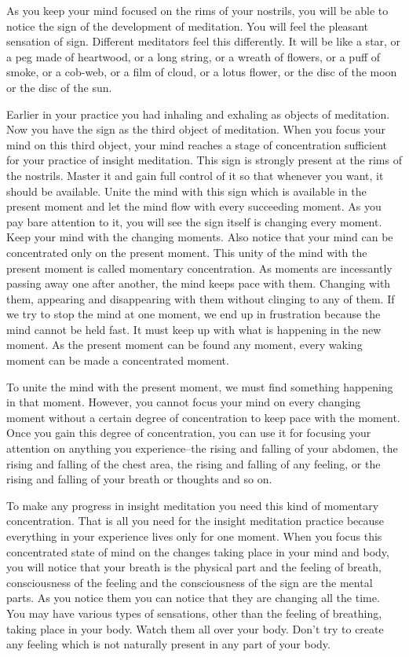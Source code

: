 As you keep your mind focused on the rims of your nostrils, you will be able to
notice the sign of the development of meditation.
You will feel the pleasant sensation of sign. Different meditators feel this differently. It will be like a star, or a peg made of
heartwood, or a long string, or a wreath of flowers, or a puff of smoke, or a cob-web, or a film of cloud, or a lotus flower, or the
disc of the moon or the disc of the sun.

Earlier in your practice you had inhaling and exhaling as objects of meditation.
Now you have the sign as the third object of meditation. When you focus your
mind on this third object, your mind reaches a stage of concentration sufficient
for your practice of insight meditation. This sign is strongly present at the
rims of the nostrils. Master it and gain full control of it so that whenever you
want, it should be available. Unite the mind with this sign which is available
in the present moment and let the mind flow with every succeeding moment. As you
pay bare attention to it, you will see the sign itself is changing every moment.
Keep your mind with the changing moments. Also notice that your mind can be
concentrated only on the present moment. This unity of the mind with the present
moment is called momentary concentration. As moments are incessantly passing
away one after another, the mind keeps pace with them. Changing with them,
appearing and disappearing with them without clinging to any of them. If we try
to stop the mind at one moment, we end up in frustration because the mind cannot
be held fast. It must keep up with what is happening in the new moment. As the
present moment can be found any moment, every waking moment can be made a
concentrated moment.

To unite the mind with the present moment, we must find something happening in
that moment. However, you cannot focus your mind on every changing moment
without a certain degree of concentration to keep pace with the moment. Once you
gain this degree of concentration, you can use it for focusing your attention on
anything you experience--the rising and falling of your abdomen, the rising and
falling of the chest area, the rising and falling of any feeling, or the rising
and falling of your breath or thoughts and so on.

To make any progress in insight meditation you need this kind of momentary
concentration. That is all you need for the insight meditation practice because
everything in your experience lives only for one moment. When you focus this
concentrated state of mind on the changes taking place in your mind and body,
you will notice that your breath is the physical part and the feeling of breath,
consciousness of the feeling and the consciousness of the sign are the mental
parts. As you notice them you can notice that they are changing all the time.
You may have various types of sensations, other than the feeling of breathing,
taking place in your body. Watch them all over your body. Don't try to create
any feeling which is not naturally present in any part of your body.

